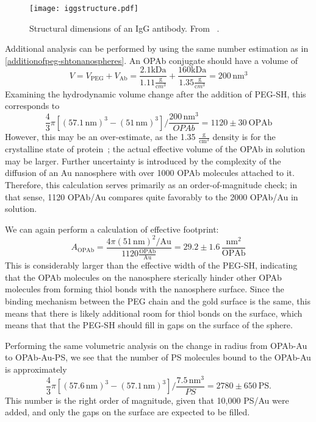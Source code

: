 \begin{figure}[htbp]
\centering
\texttt{[image: iggstructure.pdf]}
\caption{Structural dimensions of an IgG antibody. From ~\citep{antibodylength}.}
\label{iggstructure}
\end{figure}




Additional analysis can be performed by using the same number estimation as in \autoref{additionofpeg-shtonanospheres}. An OPAb conjugate should have a volume of
\[V=V_{\mathrm{PEG}}+V_{\mathrm{Ab}}=\frac{2.1\mathrm{kDa}}{1.11\frac{\mathrm g}{\mathrm cm^3}}+\frac{160\mathrm{kDa}}{1.35\frac{\mathrm g}{\mathrm cm^3}}=200\,\mathrm{nm}^3\]
Examining the hydrodynamic volume change after the addition of PEG-SH, this corresponds to
\[\frac{4}{3}\pi[(57.1\mathrm{\,nm})^3-(51\mathrm{\,nm})^3]/\frac{200\,\mathrm{nm}^3}{OPAb}=1120\pm30\mathrm{\ OPAb}\]
However, this may be an over-estimate, as the 1.35 $\mathrm{\frac{g}{cm^3}}$ density is for the crystalline state of protein~\citep{proteindensity}; the actual effective volume of the OPAb in solution may be larger. Further uncertainty is introduced by the complexity of the diffusion of an Au nanosphere with over 1000 OPAb molecules attached to it. Therefore, this calculation serves primarily as an order-of-magnitude check; in that sense, 1120 OPAb/Au compares quite favorably to the 2000 OPAb/Au in solution.

We can again perform a calculation of effective footprint: \[A_{\mathrm{OPAb}}=\frac{4\pi(51\mathrm{\,nm})^2/\mathrm{Au}}{1120\mathrm{\frac{OPAb}{Au}}}=29.2\pm1.6\,\frac{\mathrm{nm}^2}{\mathrm{OPAb}}\]
This is considerably larger than the effective width of the PEG-SH, indicating that the OPAb molecules on the nanosphere sterically hinder other OPAb molecules from forming thiol bonds with the nanosphere surface. Since the binding mechanism between the PEG chain and the gold surface is the same, this means that there is likely additional room for thiol bonds on the surface, which means that that the PEG-SH should fill in gaps on the surface of the sphere.

Performing the same volumetric analysis on the change in radius from OPAb-Au to OPAb-Au-PS, we see that the number of PS molecules bound to the OPAb-Au is approximately
\[\frac{4}{3}\pi[(57.6\mathrm{\,nm})^3-(57.1\mathrm{\,nm})^3]/\frac{7.5\,\mathrm{nm}^3}{PS}=2780\pm650\mathrm{\ PS}.\]
This number is the right order of magnitude, given that 10,000 PS\slash Au were added, and only the gaps on the surface are expected to be filled.

